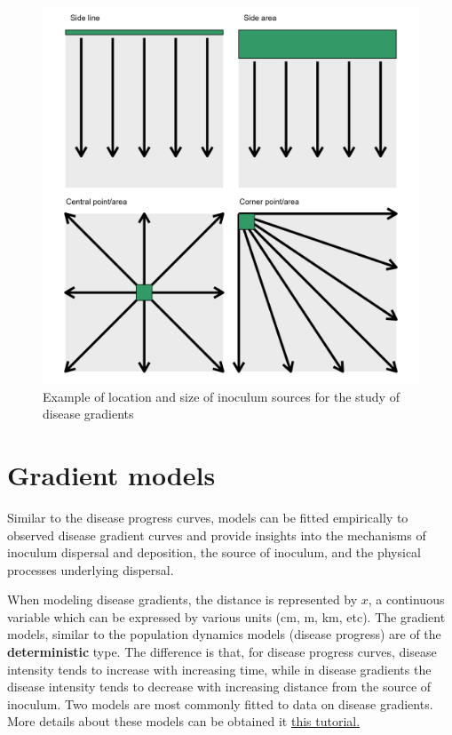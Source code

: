 \documentclass[
  letterpaper,
]{book}
\begin{document}
\begin{figure}

{\centering \includegraphics[width=6.08333in,height=\textheight]{imgs/gradients.png}

}

\caption{\label{fig-gradient}Example of location and size of inoculum
sources for the study of disease gradients}

\end{figure}

\hypertarget{gradient-models}{%
\chapter{Gradient models}\label{gradient-models}}

Similar to the disease progress curves, models can be fitted empirically
to observed disease gradient curves and provide insights into the
mechanisms of inoculum dispersal and deposition, the source of inoculum,
and the physical processes underlying dispersal.

When modeling disease gradients, the distance is represented by \(x\), a
continuous variable which can be expressed by various units (cm, m, km,
etc). The gradient models, similar to the population dynamics models
(disease progress) are of the \textbf{deterministic} type. The
difference is that, for disease progress curves, disease intensity tends
to increase with increasing time, while in disease gradients the disease
intensity tends to decrease with increasing distance from the source of
inoculum. Two models are most commonly fitted to data on disease
gradients. More details about these models can be obtained it
\href{https://www.apsnet.org/edcenter/disimpactmngmnt/topc/EcologyAndEpidemiologyInR/ModelingDispersalGradients/Pages/default.aspx}{this
tutorial.}
\end{document}
